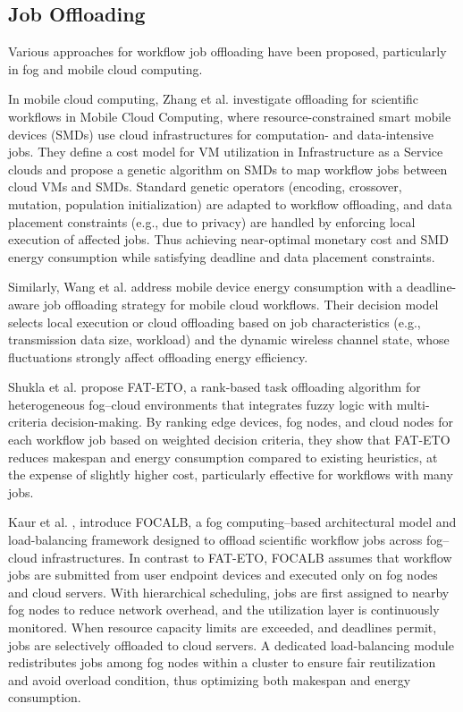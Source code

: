 \subsection{Job Offloading}
Various approaches for workflow job offloading have been proposed, particularly in fog and mobile cloud computing. 

In mobile cloud computing, Zhang et al. \cite{zhang_task_2017} investigate offloading for scientific workflows in Mobile Cloud Computing, where resource-constrained smart mobile devices (SMDs) use cloud infrastructures for computation- and data-intensive jobs. They define a cost model for VM utilization in Infrastructure as a Service clouds and propose a genetic algorithm on SMDs to map workflow jobs between cloud VMs and SMDs. Standard genetic operators (encoding, crossover, mutation, population initialization) are adapted to workflow offloading, and data placement constraints (e.g., due to privacy) are handled by enforcing local execution of affected jobs. Thus achieving near-optimal monetary cost and SMD energy consumption while satisfying deadline and data placement constraints. 

Similarly, Wang et al. \cite{wang_energy-efficient_2019} address mobile device energy consumption with a deadline-aware job offloading strategy for mobile cloud workflows. Their decision model selects local execution or cloud offloading based on job characteristics (e.g., transmission data size, workload) and the dynamic wireless channel state, whose fluctuations strongly affect offloading energy efficiency.

Shukla et al. \cite{shukla_fat-eto_2023} propose FAT-ETO, a rank-based task offloading algorithm for heterogeneous fog–cloud environments that integrates fuzzy logic with multi-criteria decision-making. By ranking edge devices, fog nodes, and cloud nodes for each workflow job based on weighted decision criteria, they show that FAT-ETO reduces makespan and energy consumption compared to existing heuristics, at the expense of slightly higher cost, particularly effective for workflows with many jobs. 

Kaur et al. \cite{kaur_focalb_2021}, introduce FOCALB, a fog computing–based architectural model and load-balancing framework designed to offload scientific workflow jobs across fog–cloud infrastructures. In contrast to FAT-ETO, FOCALB assumes that workflow jobs are submitted from user endpoint devices and executed only on fog nodes and cloud servers. With hierarchical scheduling, jobs are first assigned to nearby fog nodes to reduce network overhead, and the utilization layer is continuously monitored. When resource capacity limits are exceeded, and deadlines permit, jobs are selectively offloaded to cloud servers. A dedicated load-balancing module redistributes jobs among fog nodes within a cluster to ensure fair reutilization and avoid overload condition, thus optimizing both makespan and energy consumption.
